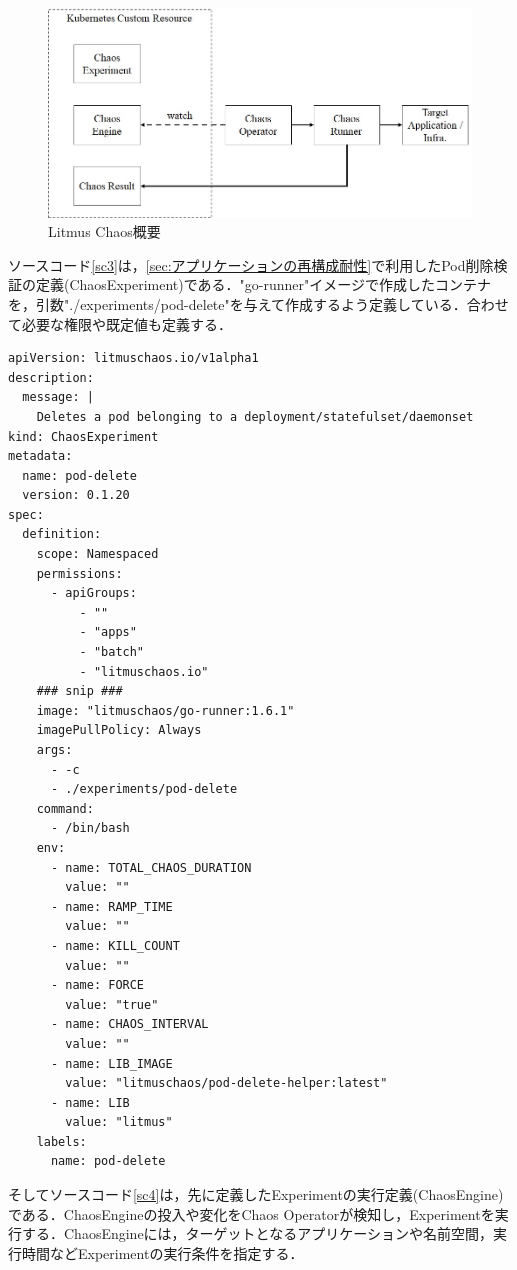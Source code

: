 \documentclass[12pt,a4j]{ujreport}
\begin{document}
\newpage
\begin{figure}[tb]
  \centerline{\includegraphics[clip,width=140mm]{images/litmus-overall.jpg}}
  \caption{Litmus Chaos概要}\label{fig13}
\end{figure}

ソースコード\ref{sc3}は，\ref{sec:アプリケーションの再構成耐性}で利用したPod削除検証の定義(ChaosExperiment)である．"go-runner"イメージで作成したコンテナを，引数"./experiments/pod-delete"を与えて作成するよう定義している．合わせて必要な権限や既定値も定義する．

\newpage
\begin{lstlisting}[caption=Litmus Chaosの実験定義(ChaosExperiment),label=sc3]
apiVersion: litmuschaos.io/v1alpha1
description:
  message: |
    Deletes a pod belonging to a deployment/statefulset/daemonset
kind: ChaosExperiment
metadata:
  name: pod-delete
  version: 0.1.20
spec:
  definition:
    scope: Namespaced
    permissions:
      - apiGroups:
          - ""
          - "apps"
          - "batch"
          - "litmuschaos.io"
    ### snip ###
    image: "litmuschaos/go-runner:1.6.1"
    imagePullPolicy: Always
    args:
      - -c
      - ./experiments/pod-delete
    command:
      - /bin/bash
    env:
      - name: TOTAL_CHAOS_DURATION
        value: ""
      - name: RAMP_TIME
        value: ""
      - name: KILL_COUNT
        value: ""
      - name: FORCE
        value: "true"
      - name: CHAOS_INTERVAL
        value: ""
      - name: LIB_IMAGE
        value: "litmuschaos/pod-delete-helper:latest"
      - name: LIB
        value: "litmus"
    labels:
      name: pod-delete
\end{lstlisting}

そしてソースコード\ref{sc4}は，先に定義したExperimentの実行定義(ChaosEngine)である．ChaosEngineの投入や変化をChaos Operatorが検知し，Experimentを実行する．ChaosEngineには，ターゲットとなるアプリケーションや名前空間，実行時間などExperimentの実行条件を指定する．
\end{document}
